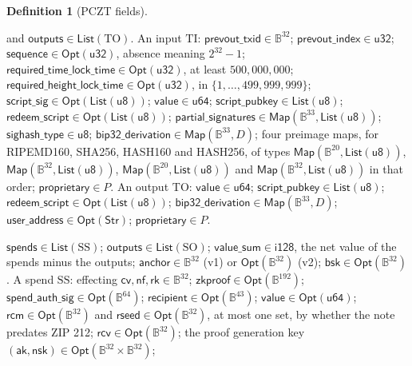 \documentclass[11pt,a4paper]{article}
\theoremstyle{definition}
\newtheorem{definition}[theorem]{Definition}
\newcommand{\nfsym}{\mathsf{nf}}
\newcommand{\cvsym}{\mathsf{cv}}
\newcommand{\rk}{\mathsf{rk}}
\newcommand{\aksym}{\ensuremath{\mathsf{ak}}}
\newcommand{\rcv}{\ensuremath{\mathsf{rcv}}}
\newcommand{\rcm}{\ensuremath{\mathsf{rcm}}}
\begin{document}
\begin{definition}[PCZT fields]
{\begin{description}[leftmargin=0pt, itemsep=2pt]
  and $\mathsf{outputs} \in \mathsf{List}(\mathrm{TO})$. An input
  $\mathrm{TI}$: $\mathsf{prevout\_txid} \in \mathbb{B}^{32}$;
  $\mathsf{prevout\_index} \in \mathsf{u32}$; $\mathsf{sequence} \in
  \mathsf{Opt}(\mathsf{u32})$, absence meaning $2^{32} - 1$;
  $\mathsf{required\_time\_lock\_time} \in \mathsf{Opt}(\mathsf{u32})$, at
  least $500{,}000{,}000$; $\mathsf{required\_height\_lock\_time} \in
  \mathsf{Opt}(\mathsf{u32})$, in $\{1, \dots, 499{,}999{,}999\}$;
  $\mathsf{script\_sig} \in \mathsf{Opt}(\mathsf{List}(\mathsf{u8}))$;
  $\mathsf{value} \in \mathsf{u64}$; $\mathsf{script\_pubkey} \in
  \mathsf{List}(\mathsf{u8})$; $\mathsf{redeem\_script} \in
  \mathsf{Opt}(\mathsf{List}(\mathsf{u8}))$; $\mathsf{partial\_signatures}
  \in \mathsf{Map}(\mathbb{B}^{33}, \mathsf{List}(\mathsf{u8}))$;
  $\mathsf{sighash\_type} \in \mathsf{u8}$; $\mathsf{bip32\_derivation} \in
  \mathsf{Map}(\mathbb{B}^{33}, D)$; four preimage maps, for RIPEMD160,
  SHA256, HASH160 and HASH256, of types $\mathsf{Map}(\mathbb{B}^{20},
  \mathsf{List}(\mathsf{u8}))$, $\mathsf{Map}(\mathbb{B}^{32},
  \mathsf{List}(\mathsf{u8}))$, $\mathsf{Map}(\mathbb{B}^{20},
  \mathsf{List}(\mathsf{u8}))$ and $\mathsf{Map}(\mathbb{B}^{32},
  \mathsf{List}(\mathsf{u8}))$ in that order; $\mathsf{proprietary} \in P$.
  An output $\mathrm{TO}$: $\mathsf{value} \in \mathsf{u64}$;
  $\mathsf{script\_pubkey} \in \mathsf{List}(\mathsf{u8})$;
  $\mathsf{redeem\_script} \in \mathsf{Opt}(\mathsf{List}(\mathsf{u8}))$;
  $\mathsf{bip32\_derivation} \in \mathsf{Map}(\mathbb{B}^{33}, D)$;
  $\mathsf{user\_address} \in \mathsf{Opt}(\mathsf{Str})$;
  $\mathsf{proprietary} \in P$.
\item[Sapling bundle.] $\mathsf{spends} \in \mathsf{List}(\mathrm{SS})$;
  $\mathsf{outputs} \in \mathsf{List}(\mathrm{SO})$; $\mathsf{value\_sum}
  \in \mathsf{i128}$, the net value of the spends minus the outputs;
  $\mathsf{anchor} \in \mathbb{B}^{32}$ (v1) or
  $\mathsf{Opt}(\mathbb{B}^{32})$ (v2); $\mathsf{bsk} \in
  \mathsf{Opt}(\mathbb{B}^{32})$. A spend $\mathrm{SS}$: effecting
  $\cvsym, \nfsym, \rk \in \mathbb{B}^{32}$; $\mathsf{zkproof} \in
  \mathsf{Opt}(\mathbb{B}^{192})$; $\mathsf{spend\_auth\_sig} \in
  \mathsf{Opt}(\mathbb{B}^{64})$; $\mathsf{recipient} \in
  \mathsf{Opt}(\mathbb{B}^{43})$; $\mathsf{value} \in
  \mathsf{Opt}(\mathsf{u64})$; $\rcm \in \mathsf{Opt}(\mathbb{B}^{32})$ and
  $\mathsf{rseed} \in \mathsf{Opt}(\mathbb{B}^{32})$, at most one set, by
  whether the note predates ZIP 212; $\rcv \in
  \mathsf{Opt}(\mathbb{B}^{32})$; the proof generation key $(\aksym,
  \mathsf{nsk}) \in \mathsf{Opt}(\mathbb{B}^{32} \times \mathbb{B}^{32})$;

\end{description}}
\end{definition}
\end{document}
